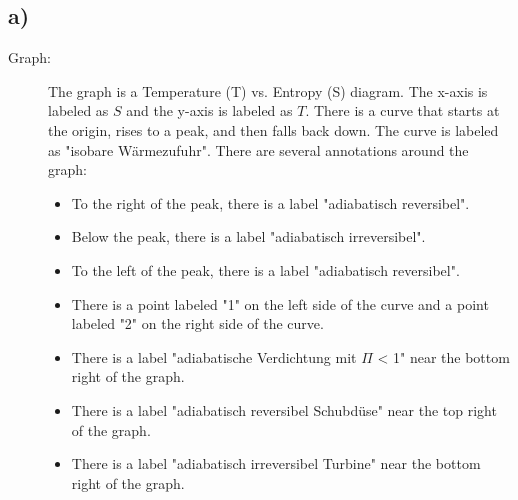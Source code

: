

\subsection*{a)}

\begin{description}
    \item[Graph:] The graph is a Temperature (T) vs. Entropy (S) diagram. The x-axis is labeled as $S$ and the y-axis is labeled as $T$. There is a curve that starts at the origin, rises to a peak, and then falls back down. The curve is labeled as "isobare Wärmezufuhr". There are several annotations around the graph:
    \begin{itemize}
        \item To the right of the peak, there is a label "adiabatisch reversibel".
        \item Below the peak, there is a label "adiabatisch irreversibel".
        \item To the left of the peak, there is a label "adiabatisch reversibel".
        \item There is a point labeled "1" on the left side of the curve and a point labeled "2" on the right side of the curve.
        \item There is a label "adiabatische Verdichtung mit $\Pi$ < 1" near the bottom right of the graph.
        \item There is a label "adiabatisch reversibel Schubdüse" near the top right of the graph.
        \item There is a label "adiabatisch irreversibel Turbine" near the bottom right of the graph.
    \end{itemize}
\end{description}